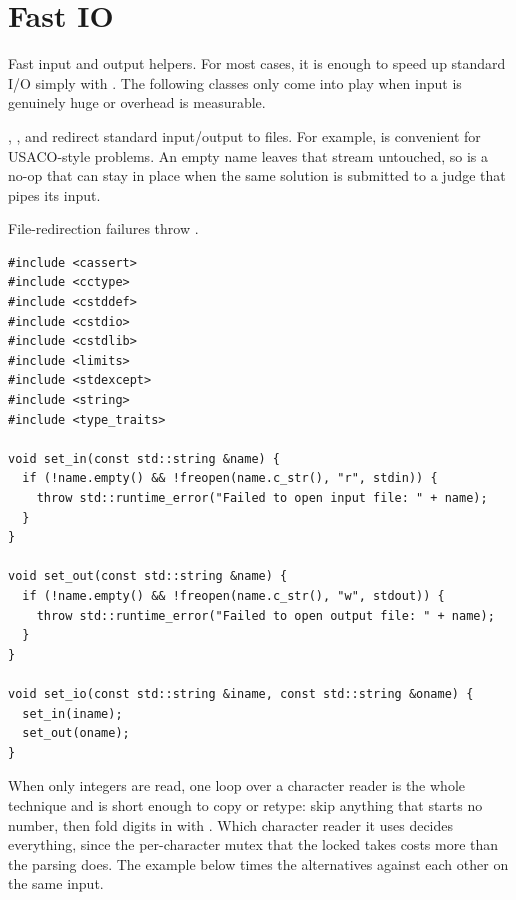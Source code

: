 \section{\texorpdfstring{Fast IO}{8.2 Fast IO}}
\setcounter{section}{2}
\label{sec:8.2}
Fast input and output helpers. For most cases, it is enough to speed up standard I/O simply with . The following classes only come into play when input is genuinely huge or  overhead is measurable.

\begin{compactitem}
  \item {}, , and  redirect standard input/output to files. For example,  is convenient for USACO-style problems. An empty name leaves that stream untouched, so  is a no-op that can stay in place when the same solution is submitted to a judge that pipes its input.
\end{compactitem}

File-redirection failures throw .

\begin{lstlisting}[style=cpp]
#include <cassert>
#include <cctype>
#include <cstddef>
#include <cstdio>
#include <cstdlib>
#include <limits>
#include <stdexcept>
#include <string>
#include <type_traits>

void set_in(const std::string &name) {
  if (!name.empty() && !freopen(name.c_str(), "r", stdin)) {
    throw std::runtime_error("Failed to open input file: " + name);
  }
}

void set_out(const std::string &name) {
  if (!name.empty() && !freopen(name.c_str(), "w", stdout)) {
    throw std::runtime_error("Failed to open output file: " + name);
  }
}

void set_io(const std::string &iname, const std::string &oname) {
  set_in(iname);
  set_out(oname);
}
\end{lstlisting}
When only integers are read, one loop over a character reader is the whole technique and is short enough to copy or retype: skip anything that starts no number, then fold digits in with . Which character reader it uses decides everything, since the per-character mutex that the locked  takes costs more than the parsing does. The example below times the alternatives against each other on the same input.

